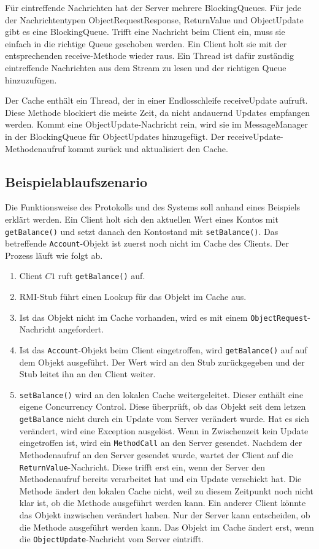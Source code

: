 Für eintreffende Nachrichten hat der Server mehrere BlockingQueues. Für jede der Nachrichtentypen ObjectRequestResponse, ReturnValue und ObjectUpdate gibt es eine BlockingQueue. Trifft eine Nachricht beim Client ein, muss sie einfach in die richtige Queue geschoben werden. Ein Client holt sie mit der entsprechenden receive-Methode wieder raus. Ein Thread ist dafür zuständig eintreffende Nachrichten aus dem Stream zu lesen und der richtigen Queue hinzuzufügen. 

Der Cache enthält ein Thread, der in einer Endlosschleife receiveUpdate aufruft. Diese Methode blockiert die meiste Zeit, da nicht andauernd Updates empfangen werden. Kommt eine ObjectUpdate-Nachricht rein, wird sie im MessageManager in der BlockingQueue für ObjectUpdates hinzugefügt. Der receiveUpdate-Methodenaufruf kommt zurück und aktualisiert den Cache.

\subsection{Beispielablaufszenario}
\label{sec:beisp}

Die Funktionsweise des Protokolls und des Systems soll anhand eines Beispiels erklärt werden. Ein Client holt sich den aktuellen Wert eines Kontos mit \texttt{getBalance()} und setzt danach den Kontostand mit \texttt{setBalance()}. Das betreffende \texttt{Account}-Objekt ist zuerst noch nicht im Cache des Clients. Der Prozess läuft wie folgt ab.

\begin{enumerate}
\item Client $C1$ ruft \verb+getBalance()+ auf.
\item RMI-Stub führt einen Lookup für das Objekt im Cache aus.
\item Ist das Objekt nicht im Cache vorhanden, wird es mit einem \texttt{Object\-Request}-Nachricht angefordert.
\item Ist das \texttt{Account}-Objekt beim Client eingetroffen, wird \verb+getBalance()+ auf auf dem Objekt ausgeführt. Der Wert wird an den Stub zurück\-gegeben und der Stub leitet ihn an den Client weiter.
\item \verb+setBalance()+ wird an den lokalen Cache weitergeleitet. Dieser enthält eine eigene Concurrency Control. Diese überprüft, ob das Objekt seit dem letzen \verb+getBalance+ nicht durch ein Update vom Server verändert wurde. Hat es sich verändert, wird eine Exception ausgelöst. Wenn in Zwischenzeit kein Update eingetroffen ist, wird ein \texttt{MethodCall} an den Server gesendet. Nachdem der Methodenaufruf an den Server gesendet wurde, wartet der Client auf die \texttt{ReturnValue}-Nachricht. Diese trifft erst ein, wenn der Server den Methodenaufruf bereits verarbeitet hat und ein Update verschickt hat. Die Methode ändert den lokalen Cache nicht, weil zu diesem Zeitpunkt noch nicht klar ist, ob die Methode ausgeführt werden kann. Ein anderer Client könnte das Objekt inzwischen verändert haben. Nur der Server kann entscheiden, ob die Methode ausgeführt werden kann. Das Objekt im Cache ändert erst, wenn die \texttt{ObjectUpdate}-Nachricht vom Server eintrifft.
\end{enumerate}


